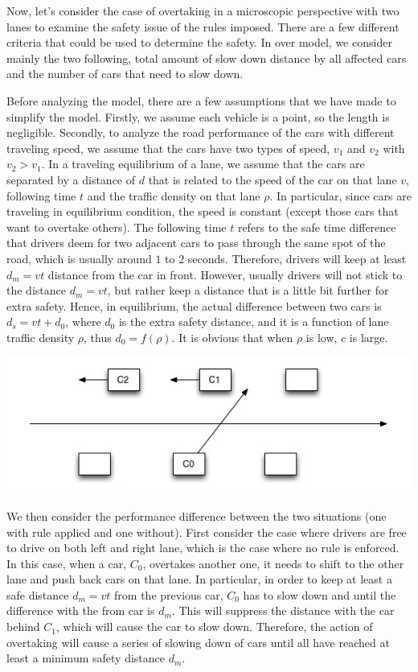 Now, let's consider the case of overtaking in a microscopic perspective with two lanes to examine the safety issue of the rules imposed. There are a few different criteria that could be used to determine the safety. In over model, we consider mainly the two following, total amount of slow down distance by all affected cars and the number of cars that need to slow down. 

Before analyzing the model, there are a few assumptions that we have made to simplify the model. Firstly, we assume each vehicle is a point, so the length is negligible. Secondly, to analyze the road performance of the cars with different traveling speed, we assume that the cars have two types of speed, $v_1$ and $v_2$ with $v_2 > v_1$. In a traveling equilibrium of a lane, we assume that the cars are separated by a distance of $d$ that is related to the speed of the car on that lane $v$, following time $t$ and the traffic density on that lane $\rho$. In particular, since cars are traveling in equilibrium condition, the speed is constant (except those cars that want to overtake others). The following time $t$ refers to the safe time difference that drivers deem for two adjacent cars to pass through the same spot of the road, which is usually around $1$ to $2$ seconds. Therefore, drivers will keep at least $d_m = vt$ distance from the car in front. However, usually drivers will not stick to the distance $d_m = vt$, but rather keep a distance that is a little bit further for extra safety. Hence, in equilibrium, the actual difference between two cars is $d_s = vt + d_0$, where $d_0$ is the extra safety distance, and it is a function of lane traffic density $\rho$, thus $d_0 = f(\rho)$. It is obvious that when $\rho$ is low, $c$ is large.

\begin{center}
\includegraphics[scale = 0.5]{plot/P1}
\end{center}

We then consider the performance difference between the two situations (one with rule applied and one without). First consider the case where drivers are free to drive on both left and right lane, which is the case where no rule is enforced. In this case, when a car, $C_0$, overtakes another one, it needs to shift to the other lane and push back cars on that lane. In particular, in order to keep at least a safe distance $d_m = vt$ from the previous car, $C_0$ has to slow down and until the difference with the from car is $d_m$. This will suppress the distance with the car behind $C_1$, which will cause the car to slow down. Therefore, the action of overtaking will cause a series of slowing down of cars until all have reached at least a minimum safety distance $d_m$. 

